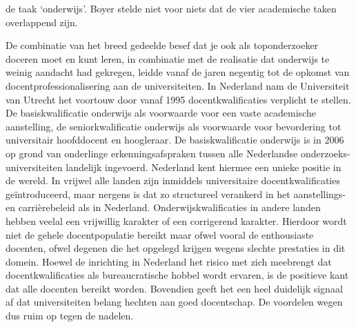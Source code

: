 \documentclass[smallauthor, chapterhaspagenum, nochapterinheader, pagenuminheader,  bigchapnum,medium2, tocpages, garamond, titleinheader]{jote-book}
\begin{document}
de taak ‘onderwijs'. Boyer stelde niet voor niets dat de vier academische taken overlappend zijn.



	De combinatie van het breed gedeelde besef dat je ook als toponderzoeker doceren moet en kunt leren, in combinatie met de realisatie dat onderwijs te weinig aandacht had gekregen, leidde vanaf de jaren negentig tot de opkomst van docentprofessionalisering aan de universiteiten. In Nederland nam de Universiteit van Utrecht het voortouw door vanaf 1995 docentkwalificaties verplicht te stellen. De basiskwalificatie onderwijs als voorwaarde voor een vaste academische aanstelling, de seniorkwalificatie onderwijs als voorwaarde voor bevordering tot universitair hoofddocent en hoogleraar. De basiskwalificatie onderwijs is in 2006 op grond van onderlinge erkenningsafspraken tussen alle Nederlandse onderzoeks-universiteiten landelijk ingevoerd. Nederland kent hiermee een unieke positie in de wereld. In vrijwel alle landen zijn inmiddels universitaire docentkwalificaties geïntroduceerd, maar nergens is dat zo structureel verankerd in het aanstellings- en carrièrebeleid als in Nederland. Onderwijskwalificaties in andere landen hebben veelal een vrijwillig karakter of een corrigerend karakter. Hierdoor wordt niet de gehele docentpopulatie bereikt maar ofwel vooral de enthousiaste docenten, ofwel degenen die het opgelegd krijgen wegens slechte prestaties in dit domein. Hoewel de inrichting in Nederland het risico met zich meebrengt dat docentkwalificaties als bureaucratische hobbel wordt ervaren, is de positieve kant dat alle docenten bereikt worden. Bovendien geeft het een heel duidelijk signaal af dat universiteiten belang hechten aan goed docentschap. De voordelen wegen dus ruim op tegen de nadelen.
\end{document}
